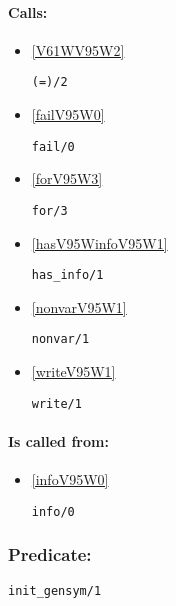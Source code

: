 \paragraph{Calls:} 
\begin{itemize}
\item \ref{V61WV95W2} 
\begin{verbatim}
(=)/2
\end{verbatim}

\item \ref{failV95W0} 
\begin{verbatim}
fail/0
\end{verbatim}

\item \ref{forV95W3} 
\begin{verbatim}
for/3
\end{verbatim}

\item \ref{hasV95WinfoV95W1} 
\begin{verbatim}
has_info/1
\end{verbatim}

\item \ref{nonvarV95W1} 
\begin{verbatim}
nonvar/1
\end{verbatim}

\item \ref{writeV95W1} 
\begin{verbatim}
write/1
\end{verbatim}

\end{itemize}
\paragraph{Is called from:} 
\begin{itemize}
\item \ref{infoV95W0} 
\begin{verbatim}
info/0
\end{verbatim}

\end{itemize}

\subsubsection{Predicate:} \label{initV95WgensymV95W1}

\begin{verbatim}
init_gensym/1
\end{verbatim}

